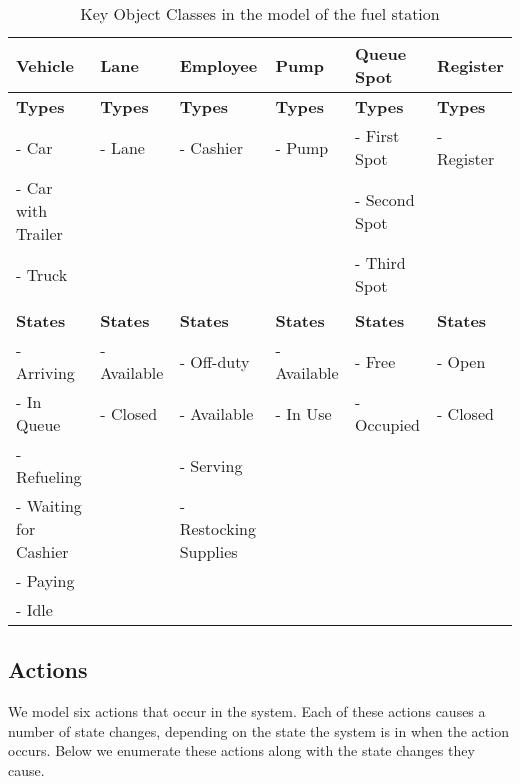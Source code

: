\begin{center}
\begin{table}[h]
\caption{Key Object Classes in the model of the fuel station}
\begin{tabular}{| l | l | l | l | l | l |}
\hline
\textbf{Vehicle} & \textbf{Lane} & \textbf{Employee} & \textbf{Pump} & \textbf{Queue Spot} & \textbf{Register}\\
\hline
\textbf{Types} & \textbf{Types} & \textbf{Types} & \textbf{Types} & \textbf{Types} & \textbf{Types}\\
- Car & - Lane & - Cashier& - Pump & - First Spot & - Register\\
- Car with Trailer & & & & - Second Spot &\\
- Truck & & & & - Third Spot &\\
& & & & &\\
\textbf{States} & \textbf{States} & \textbf{States} & \textbf{States} & \textbf{States} & \textbf{States}\\
- Arriving & - Available & - Off-duty & - Available & - Free & - Open\\
- In Queue & - Closed & - Available & - In Use & - Occupied & - Closed\\
- Refueling & & - Serving & & &\\
- Waiting for Cashier & & - Restocking Supplies & & &\\
- Paying & & & & &\\
- Idle & & & & &\\
\hline
\end{tabular}
\label{tab:koc}
\end{table}
\end{center}

\subsection{Actions}
We model six actions that occur in the system.
Each of these actions causes a number of state changes, depending on the state the system is in when the action occurs.
Below we enumerate these actions along with the state changes they cause.

